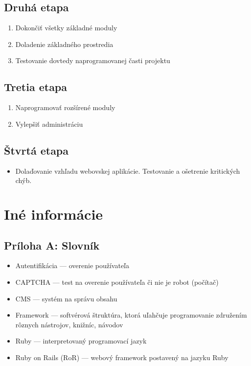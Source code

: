 \documentclass[a4paper,titlepage,11pt]{article}
\begin{document}
\subsection{Druhá etapa}
\begin{enumerate}
 \item Dokončiť všetky základné moduly
 \item Doladenie základného prostredia
 \item Testovanie dovtedy naprogramovanej časti projektu
\end{enumerate}

\subsection{Tretia etapa}
\begin{enumerate}
 \item Naprogramovať rozšírené moduly
 \item Vylepšiť administráciu
\end{enumerate}

\subsection{Štvrtá etapa}
\begin{itemize}
 \item Dolaďovanie vzhľadu webovskej aplikácie. Testovanie a ošetrenie kritických chýb. 
\end{itemize}

\newpage
\section{Iné informácie}

\subsection*{Príloha A: Slovník}
\begin{itemize}
 \item Autentifikácia --- overenie používateľa
 \item CAPTCHA --- test na overenie používateľa či nie je robot (počítač)
 \item CMS --- systém na správu obsahu
 \item Framework --- softvérová štruktúra, ktorá uľahčuje programovanie združením rôznych nástrojov, knižníc, návodov 
 \item Ruby --- interpretovaný programovací jazyk
 \item Ruby on Rails (RoR) --- webový framework postavený na jazyku Ruby
\end{itemize}
\end{document}
